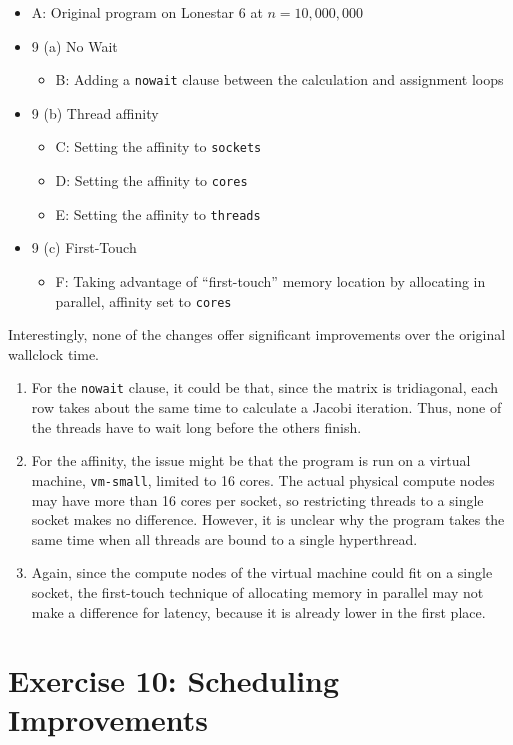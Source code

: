 \documentclass{article}
\begin{document}
\begin{itemize}
	
	\item A: Original program on Lonestar 6 at $n = 10,000,000$
	\item 9 (a) No Wait
	\begin{itemize}
		\item B: Adding a \verb|nowait| clause between the calculation and assignment loops
	\end{itemize}
	\item 9 (b) Thread affinity
	\begin{itemize}
		\item C: Setting the affinity to \verb|sockets|
		\item D: Setting the affinity to \verb|cores|
		\item E: Setting the affinity to \verb|threads|
	\end{itemize}
	\item 9 (c) First-Touch
	\begin{itemize}
		\item F: Taking advantage of ``first-touch'' memory location by allocating in parallel, affinity set to \verb|cores|
	\end{itemize}
\end{itemize}

Interestingly, none of the changes offer significant improvements over the original wallclock time.
\begin{enumerate}
	\item For the \verb|nowait| clause, it could be that, since the matrix is tridiagonal, each row takes about the same time to calculate a Jacobi iteration. Thus, none of the threads have to wait long before the others finish.
	\item For the affinity, the issue might be that the program is run on a virtual machine, \verb|vm-small|, limited to 16 cores. The actual physical compute nodes may have more than 16 cores per socket, so restricting threads to a single socket makes no difference. However, it is unclear why the program takes the same time when all threads are bound to a single hyperthread.
	\item Again, since the compute nodes of the virtual machine could fit on a single socket, the first-touch technique of allocating memory in parallel may not make a difference for latency, because it is already lower in the first place.
\end{enumerate}

\section{Exercise 10: Scheduling Improvements}
\end{document}
